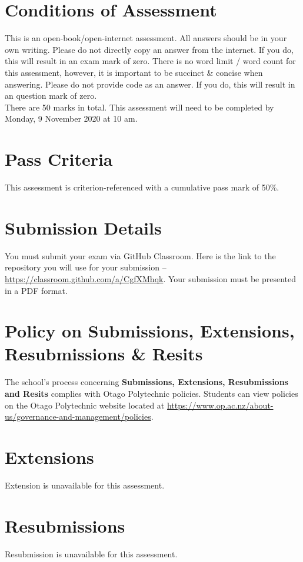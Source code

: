 \documentclass{article}
\begin{document}
\section*{Conditions of Assessment}
This is an open-book/open-internet assessment. All answers should be in your own writing. Please do not directly copy an answer from the internet. If you do, this will result in an exam mark of zero. There is no word limit / word count for this assessment, however, it is important to be succinct \& concise when answering. Please do not provide code as an answer. If you do, this will result in an question mark of zero. \\ 

There are 50 marks in total. This assessment will need to be completed by Monday, 9 November 2020 at 10 am. 

\section*{Pass Criteria}
This assessment is criterion-referenced with a cumulative pass mark of 50\%.

\section*{Submission Details}
You must submit your exam via GitHub Classroom. Here is the link to the repository you will use for your submission – \href{https://classroom.github.com/a/CgfXMhqk}{https://classroom.github.com/a/CgfXMhqk}. Your submission must be presented in a PDF format. 

\section*{Policy on Submissions, Extensions, Resubmissions \& Resits}
The school's process concerning \textbf{Submissions, Extensions, Resubmissions and Resits} complies with Otago Polytechnic policies. Students can view policies on the Otago Polytechnic website located at \href{https://www.op.ac.nz/about-us/governance-and-management/policies}{https://www.op.ac.nz/about-us/governance-and-management/policies}.

\section*{Extensions}
Extension is unavailable for this assessment. 

\section*{Resubmissions}
Resubmission is unavailable for this assessment.
\end{document}
